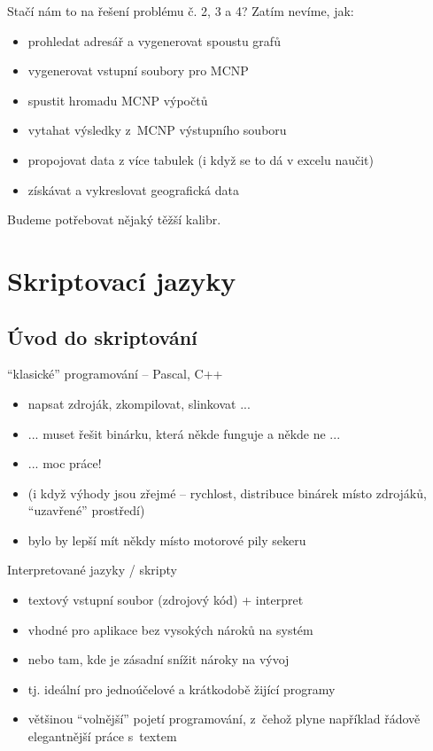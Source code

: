 \documentclass{beamer}
\begin{document}
\begin{frame}{Stačí nám to na řešení problému č. 2, 3 a 4?}
  Zatím nevíme, jak:
  \begin{itemize}
    \item prohledat adresář a vygenerovat spoustu grafů
  \end{itemize}
  \begin{itemize}
    \item vygenerovat vstupní soubory pro MCNP
    \item spustit hromadu MCNP výpočtů
    \item vytahat výsledky z~MCNP výstupního souboru
  \end{itemize}
  \begin{itemize}
    \item propojovat data z více tabulek (i když se to dá v excelu naučit)
    \item získávat a vykreslovat geografická data
  \end{itemize}
  Budeme potřebovat nějaký těžší kalibr.
\end{frame}

\section{Skriptovací jazyky}

\subsection{Úvod do skriptování}

\begin{frame}{``klasické'' programování -- Pascal, C++}
  \begin{itemize}
    \item napsat zdroják, zkompilovat, slinkovat ...
    \item ... muset řešit binárku, která někde funguje a někde ne ...
    \item ... moc práce!
    \item (i když výhody jsou zřejmé -- rychlost, distribuce binárek místo zdrojáků, ``uzavřené'' prostředí)
    \item bylo by lepší mít někdy místo motorové pily sekeru
  \end{itemize}
\end{frame}

\begin{frame}{Interpretované jazyky / skripty}
  \begin{itemize}
    \item textový vstupní soubor (zdrojový kód) + interpret
    \item vhodné pro aplikace bez vysokých nároků na systém
    \item nebo tam, kde je zásadní snížit nároky na vývoj
    \item tj. ideální pro jednoúčelové a krátkodobě žijící programy
    \item většinou ``volnější'' pojetí programování, z~čehož plyne například řádově elegantnější práce s~textem
  \end{itemize}
\end{frame}
\end{document}
